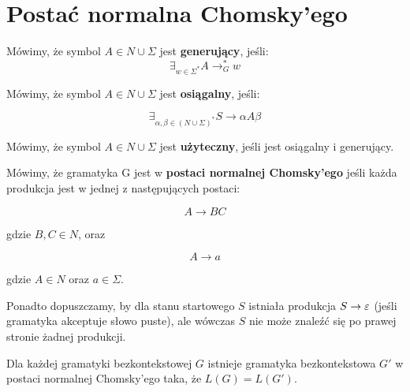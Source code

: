 \section{Postać normalna Chomsky'ego}

\begin{definition}
	Mówimy, że symbol \(A \in N \cup \Sigma \) jest \textbf{generujący}, jeśli:
	\[
		\exists_{w \in \Sigma^*}A \rightarrow_{G}^* w
	\]

\end{definition}

\begin{definition}
	Mówimy, że symbol \(A \in N \cup \Sigma\) jest \textbf{osiągalny}, jeśli:

	\[
		\exists_{\alpha, \beta \in (N \cup \Sigma)^*} S \rightarrow \alpha A \beta
	\]
\end{definition}

\begin{definition}
	Mówimy, że symbol \(A \in N \cup \Sigma \) jest \textbf{użyteczny}, jeśli jest osiągalny i generujący.
\end{definition}

\begin{definition}
	Mówimy, że gramatyka G jest w \textbf{postaci normalnej Chomsky'ego} jeśli każda produkcja jest w jednej z następujących postaci:

	\[
		A \rightarrow BC
	\]

	gdzie \(B, C \in N \), oraz

	\[
		A \rightarrow a
	\]

	gdzie \(A \in N\) oraz \(a \in \Sigma\).

	Ponadto dopuszczamy, by dla stanu startowego \(S\) istniała produkcja \(S \rightarrow \varepsilon\) (jeśli gramatyka akceptuje słowo puste), ale wówczas \(S\) nie może znaleźć się po prawej stronie żadnej produkcji.

\end{definition}

\begin{theorem}
	Dla każdej gramatyki bezkontekstowej \(G\) istnieje gramatyka bezkontekstowa \(G'\) w postaci normalnej Chomsky'ego taka, że \(L(G) = L(G')\).
\end{theorem}

